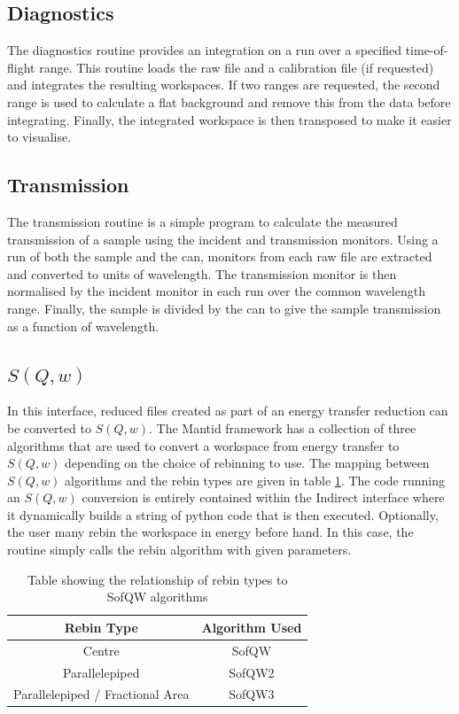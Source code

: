 \documentclass[paper=a4, fontsize=11pt]{scrartcl}	%
\numberwithin{equation}{section}															%
\numberwithin{figure}{section}																%
\numberwithin{table}{section}																%
\begin{document}
\subsection{Diagnostics}
The diagnostics routine provides an integration on a run over a specified time-of-flight range. This routine loads the raw file and a calibration file (if requested) and integrates the resulting workspaces. If two ranges are requested, the second range is used to calculate a flat background and remove this from the data before integrating. Finally, the integrated workspace is then transposed to make it easier to visualise.

\subsection{Transmission}
The transmission routine is a simple program to calculate the measured transmission of a sample using the incident and transmission monitors. Using a run of both the sample and the can, monitors from each  raw file are extracted and converted to units of wavelength. The transmission monitor is then normalised by the incident monitor in each run over the common wavelength range. Finally, the sample is divided by the can to give the sample transmission as a function of wavelength.

\subsection{$S(Q,w)$}
In this interface, reduced files created as part of an energy transfer reduction can be converted to $S(Q,w)$. The Mantid framework has a collection of three algorithms that are used to convert a workspace from energy transfer to $S(Q,w)$ depending on the choice of rebinning to use. The mapping between $S(Q,w)$ algorithms and the rebin types are given in table \ref{table:sofqw-algorithms}. The code running an $S(Q,w)$ conversion is entirely contained within the Indirect interface where it dynamically builds a string of python code that is then executed. Optionally, the user many rebin the workspace in energy before hand. In this case, the routine simply calls the rebin algorithm with given parameters.

\begin{table}[H]
\begin{center}
\begin{tabular}{ c c}
Rebin Type & Algorithm Used \\ \hline
Centre & SofQW \\
Parallelepiped & SofQW2 \\
Parallelepiped / Fractional Area & SofQW3 \\
\end{tabular}
\caption{Table showing the relationship of rebin types to SofQW algorithms}
\label{table:sofqw-algorithms}
\end{center}
\end{table}
\end{document}
